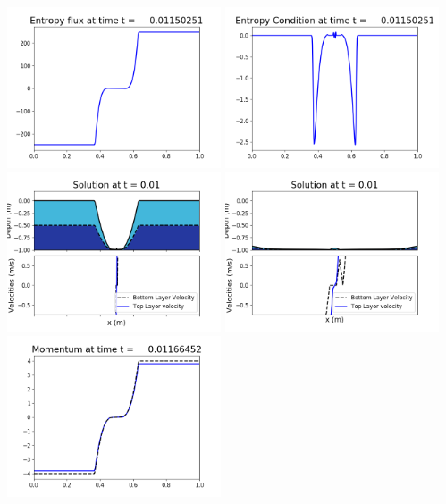 \documentclass[11pt]{article}
\begin{document}
\includegraphics[width=0.475\textwidth]{frame0072fig1008.png}
\vskip 10pt 
\includegraphics[width=0.475\textwidth]{frame0072fig1009.png}
\vskip 10pt 
\includegraphics[width=0.475\textwidth]{frame0073fig1001.png}
\includegraphics[width=0.475\textwidth]{frame0073fig1002.png}
\vskip 10pt 
\includegraphics[width=0.475\textwidth]{frame0073fig1003.png}
\end{document}
